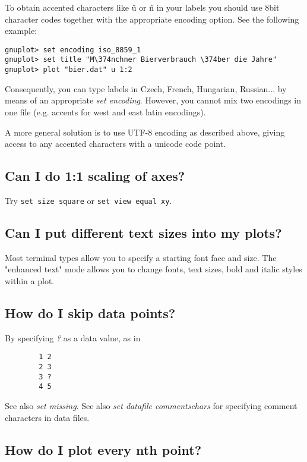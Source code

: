 \documentclass[a4paper,11pt]{article}
\begin{document}
To obtain accented characters like \"u or \^n in your labels you should use
8bit character codes together with the appropriate encoding option.
See the following example:

\small
\begin{verbatim}
gnuplot> set encoding iso_8859_1
gnuplot> set title "M\374nchner Bierverbrauch \374ber die Jahre"
gnuplot> plot "bier.dat" u 1:2
\end{verbatim}
\normalsize

Consequently, you can type labels in Czech, French, Hungarian, Russian... by
means of an appropriate \textit{set encoding}. However, you cannot mix two
encodings in one file (e.g. accents for west and east latin encodings).

A more general solution is to use UTF-8 encoding as described above, giving
access to any accented characters with a unicode code point.

\subsection{Can I do 1:1 scaling of axes?}

Try \verb+set size square+
or \verb+set view equal xy+.


\subsection{Can I put different text sizes into my plots?}

Most terminal types allow you to specify a starting font face and size.
The "enhanced text" mode allows you to change fonts, text sizes, bold and
italic styles within a plot.

\subsection{How do I skip data points?}

By specifying \textit{?} as a data value, as in
\small
\begin{verbatim}
        1 2
        2 3
        3 ?
        4 5
\end{verbatim}
\normalsize

See also \textit{set missing}.
See also \textit{set datafile commentschars} for specifying comment characters in
data files.


\subsection{How do I plot every nth point?}
\end{document}
